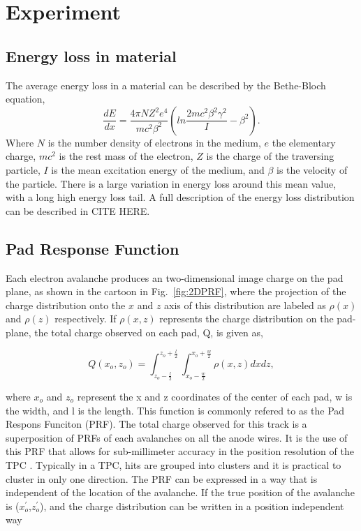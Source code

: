 \chapter{Experiment}

\section{Energy loss in material}
The average energy loss in a material can be described by the Bethe-Bloch equation,
\begin{equation}\label{eq:bb}
\frac{dE}{dx} = \frac{4\pi NZ^2e^4}{mc^2\beta^2} (ln \frac{2mc^2\beta^2\gamma^2}{I} - \beta^2).
\end{equation}
Where $N$ is the number density of electrons in the medium, $e$ the elementary charge, $mc^2$ is the rest mass of the electron, $Z$ is the charge of the traversing particle, $I$ is the mean excitation energy of the medium, and $\beta$ is the velocity of the particle. There is a large variation in energy loss around this mean value, with a long high energy loss tail. A full description of the energy loss distribution can be described in CITE HERE.


\section{Pad Response Function}
\label{sec:prf}
Each electron avalanche produces an two-dimensional image charge on the pad plane, as shown in the cartoon in Fig.~\ref{fig:2DPRF}, where the projection of the charge distribution onto the $x$ and $z$ axis of this distribution are labeled as $\rho(x)$ and $\rho(z)$ respectively. If $\rho(x,z)$ represents the charge distribution on the pad-plane, the total charge observed on each pad, Q, is given as,

\begin{equation}
Q(x_o,z_o) = \int_{z_o - \frac{l}{2}}^{z_o + \frac{l}{2}} \int_{x_o - \frac{w}{2}}^{x_o + \frac{w}{2}} \rho(x,z) dxdz,
\label{eq:prfpadCharge}
\end{equation}

where $x_o$ and $z_o$ represent the x and z coordinates of the center of each pad, w is the width, and l is the length. This function is commonly refered to as the Pad Respons Funciton (PRF). The total charge observed for this track is a superposition of PRFs of each avalanches on all the anode wires. It is the use of this PRF that allows for sub-millimeter accuracy in the position resolution of the TPC \cite{blumrol}. Typically in a TPC, hits are grouped into clusters and it is practical to cluster in only one direction. The PRF can be expressed in a way that is independent of the location of the avalanche. If the true position of the avalanche is ($x_o^{'}$,$z_o^{'}$), and the charge distribution can be written in a position independent way %

